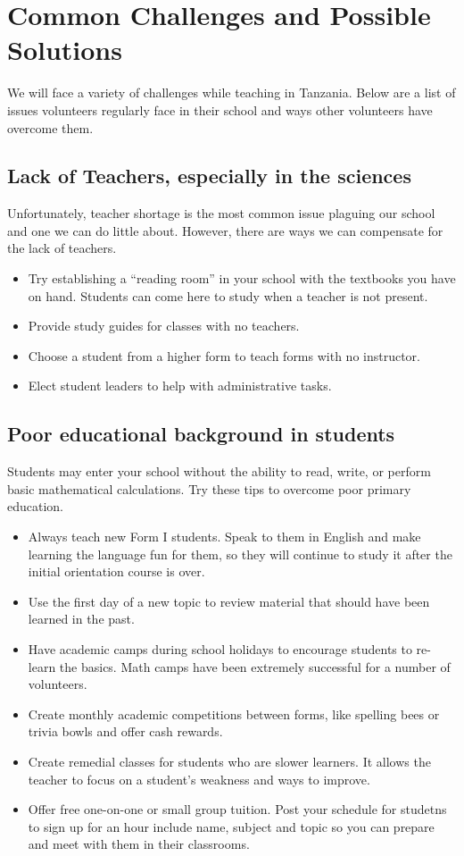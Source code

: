 \chapter{Common Challenges and Possible Solutions}
We will face a variety of challenges while teaching in Tanzania.  Below are a list of issues volunteers regularly face in their school and ways other volunteers have overcome them. 

\section{Lack of Teachers, especially in the sciences}
Unfortunately, teacher shortage is the most common issue plaguing our school and one we can do little about.  However, there are ways we can compensate for the lack of teachers.

\begin{itemize} 
 \item Try establishing a ``reading room'' in your school with the textbooks you have on hand.  Students can come here to study when a teacher is not present. 
 \item Provide study guides for classes with no teachers.
 \item Choose a student from a higher form to teach forms with no instructor.
 \item Elect student leaders to help with administrative tasks.
\end{itemize}

\section{Poor educational background in students}
Students may enter your school without the ability to read, write, or perform basic mathematical calculations.  Try these tips to overcome poor primary education.

\begin{itemize}
 \item Always teach new Form I students.  Speak to them in English and make learning the language fun for them, so they will continue to study it after the initial orientation course is over. \
 \item Use the first day of a new topic to review material that should have been learned in the past. 
 \item Have academic camps during school holidays to encourage students to re-learn the basics. Math camps have been extremely successful for a number of volunteers.
 \item Create monthly academic competitions between forms, like spelling bees or trivia bowls and offer cash rewards.
 \item Create remedial classes for students who are slower learners.  It allows the teacher to focus on a student's weakness and ways to improve.
 \item Offer free one-on-one or small group tuition. Post your schedule for studetns to sign up for an hour include name, subject and topic so you can prepare and meet with them in their classrooms.
\end{itemize}

